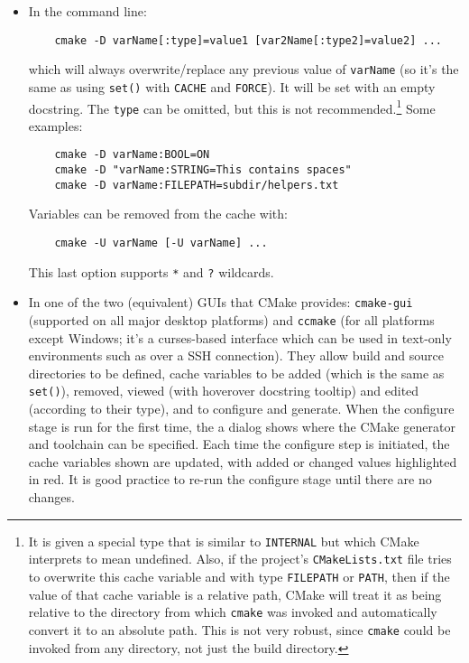 \documentclass[8pt, table, xcdraw]{article}%
\begin{document}
\begin{itemize}
    \item In the command line:
    
    \begin{lstlisting}
    cmake -D varName[:type]=value1 [var2Name[:type2]=value2] ...
    \end{lstlisting}
    
    which will always overwrite/replace any previous value of \lstinline{varName} (so it's the same as using \lstinline{set()} with \lstinline{CACHE} and \lstinline{FORCE}). It will be set with an empty docstring. The \lstinline{type} can be omitted, but this is not recommended.\footnote{It is given a special type that is similar to \lstinline{INTERNAL} but which CMake interprets to mean undefined. Also, if the project’s \lstinline{CMakeLists.txt} file tries to overwrite this cache variable and with type \lstinline{FILEPATH} or \lstinline{PATH}, then if the value of that cache variable is a relative path, CMake will treat it as being relative to the directory from which \lstinline{cmake} was invoked and automatically convert it to an absolute path. This is not very robust, since \lstinline{cmake} could be invoked from any directory, not just the build directory.} Some examples:
    
    \begin{lstlisting}
    cmake -D varName:BOOL=ON
    cmake -D "varName:STRING=This contains spaces"
    cmake -D varName:FILEPATH=subdir/helpers.txt
    \end{lstlisting}
    
    Variables can be removed from the cache with:
    
    \begin{lstlisting}
    cmake -U varName [-U varName] ...
    \end{lstlisting}
    
    This last option supports \lstinline{*} and \lstinline{?} wildcards.
    
    \item In one of the two (equivalent) GUIs that CMake provides: \lstinline{cmake-gui} (supported on all major desktop platforms) and \lstinline{ccmake} (for all platforms except Windows; it's a curses-based interface which can be used in text-only environments such as over a SSH connection). They allow build and source directories to be defined, cache variables to be added (which is the same as \lstinline{set()}), removed, viewed (with hoverover docstring tooltip) and edited (according to their type), and to configure and generate. When the configure stage is run for the first time, the a dialog shows where the CMake generator and toolchain can be specified. Each time the configure step is initiated, the cache variables shown are updated, with added or changed values highlighted in red. It is good practice to re-run the configure stage until there are no changes.
    

\end{itemize}
\end{document}
